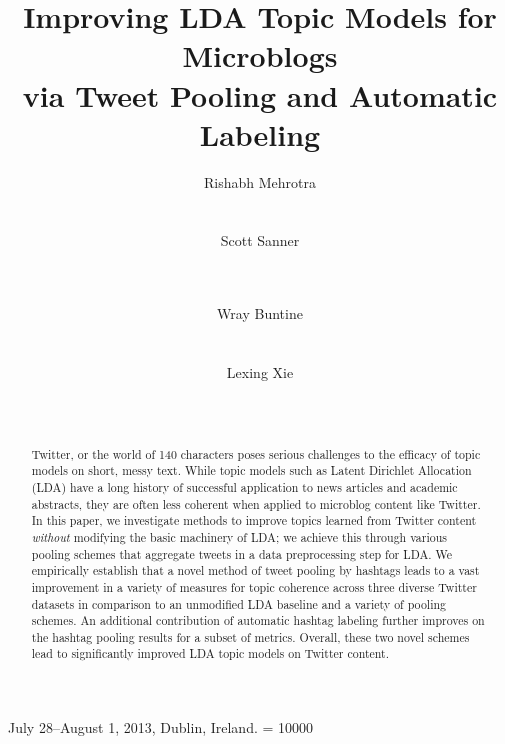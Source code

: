 \documentclass{sig-alternate}
\begin{document}
 {July 28--August 1, 2013, Dublin, Ireland.} 
\widowpenalty = 10000



\title{Improving LDA Topic Models for Microblogs\\ via Tweet Pooling and Automatic Labeling}
\author{
\alignauthor
Rishabh Mehrotra\\
       \\
       \\
\alignauthor
Scott Sanner\\
       \\
       \\
\and
\alignauthor
Wray Buntine\\
       \\
       \\
\alignauthor
Lexing Xie\\
       \\
       \\
}


\maketitle

\begin{abstract}
Twitter, or the world of 140 characters poses serious challenges to the
efficacy of topic models on short, messy text. While topic models such
as Latent Dirichlet Allocation (LDA) have a long history of successful
application to news articles and academic abstracts, they are often
less coherent when applied to microblog content like Twitter.  In this
paper, we investigate methods to improve topics learned from Twitter
content \emph{without} modifying the basic machinery of LDA; we
achieve this through various pooling schemes that aggregate tweets in
a data preprocessing step for LDA.  We empirically establish that a
novel method of tweet pooling by hashtags leads to a vast improvement
in a variety of measures for topic coherence across three diverse
Twitter datasets in comparison to an unmodified LDA baseline and a
variety of pooling schemes.  An additional contribution of automatic
hashtag labeling further improves on the hashtag pooling results for a
subset of metrics.  Overall, these two novel schemes lead to 
significantly improved LDA topic models on
Twitter content.
\end{abstract}
\end{document}
